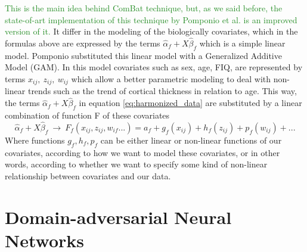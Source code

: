 \documentclass[11pt]{report}
\begin{document}
\textcolor{ForestGreen}{
This is the main idea behind ComBat technique, but, as we said before, the state-of-art implementation of this technique by Pomponio et al. \cite{pomponio-2019} is an improved version of it.
}
It differ in the modeling of the biologically covariates, which in the formulas above are expressed by the terms $\hat \alpha_f + X \hat \beta_f$ which is a simple linear model.
Pomponio substituted this linear model with a Generalized Additive Model (GAM). In this model covariates such as sex, age, FIQ, are represented by terms $x_{ij}, \ z_{ij}, \ w_{ij}$ which allow a better parametric modeling to deal with non-linear trends such as the trend of cortical thickness in relation to age.
This way, the terms $\hat \alpha_f + X \hat \beta_f$ in equation \ref{eq:harmonized_data} are substituted by a linear combination of function F of these covariates
\begin{equation}
\hat \alpha_f + X \hat \beta_f \ \longrightarrow \ F_f(x_{ij}, z_{ij}, w_{if}...) = a_f + g_f(x_{ij}) + h_f(z_{ij}) + p_f(w_{ij}) + ...
\end{equation}
Where functions $g_f, h_f, p_f$ can be either linear or non-linear functions of our covariates, according to how we want to model these covariates, or in other words, according to whether we want to specify some kind of non-linear relationship between covariates and our data.





\chapter{Domain-adversarial Neural Networks}\label{chap:domain_adversarial_theory}
\end{document}
